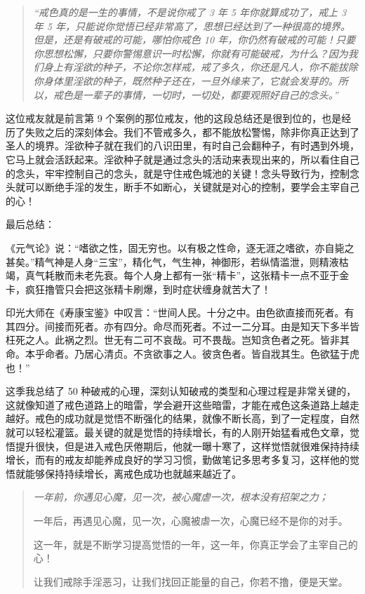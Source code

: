 \begin{quote}\it
    “戒色真的是一生的事情，不是说你戒了 3 年 5 年你就算成功了，戒上 3 年 5 年，只能说你觉悟已经非常高了，思想已经达到了一种很高的境界。但是，还是有破戒的可能，哪怕你戒色 10 年，你仍然有破戒的可能！只要你思想松懈，只要你警惕意识一时松懈，你就有可能破戒，为什么？因为我们身上有淫欲的种子，不论你怎样戒，戒了多久，你还是凡人，你不能拔除你身体里淫欲的种子，既然种子还在，一旦外缘来了，它就会发芽的。所以，戒色是一辈子的事情，一切时，一切处，都要观照好自己的念头。”
\end{quote}

这位戒友就是前言第 9 个案例的那位戒友，他的这段总结还是很到位的，也是经历了失败之后的深刻体会。我们不管戒多久，都不能放松警惕，除非你真正达到了圣人的境界。淫欲种子就在我们的八识田里，有时自己会翻种子，有时遇到外境，它马上就会活跃起来。淫欲种子就是通过念头的活动来表现出来的，所以看住自己的念头，牢牢控制自己的念头，就是守住戒色城池的关键！念头导致行为，控制念头就可以断绝手淫的发生，断手不如断心，关键就是对心的控制，要学会主宰自己的心！

最后总结：

《元气论》说：“嗜欲之性，固无穷也。以有极之性命，逐无涯之嗜欲，亦自毙之甚矣。”精气神是人身“三宝”，精化气，气生神，神御形，若纵情滥泄，则精液枯竭，真气耗散而未老先衰。每个人身上都有一张“精卡”，这张精卡一点不亚于金卡，疯狂撸管只会把这张精卡刷爆，到时症状缠身就苦大了！

印光大师在《寿康宝鉴》中叹言：“世间人民。十分之中。由色欲直接而死者。有其四分。间接而死者。亦有四分。命尽而死者。不过一二分耳。由是知天下多半皆枉死之人。此祸之烈。世无有二可不哀哉。可不畏哉。岂知贪色者之死。皆非其命。本乎命者。乃居心清贞。不贪欲事之人。彼贪色者。皆自戕其生。色欲猛于虎也！”

这季我总结了 50 种破戒的心理，深刻认知破戒的类型和心理过程是非常关键的，这就像知道了戒色道路上的暗雷，学会避开这些暗雷，才能在戒色这条道路上越走越好。戒色的成功就是觉悟不断强化的结果，就像不断长高，到了一定程度，自然就可以轻松灌篮。最关键的就是觉悟的持续增长，有的人刚开始猛看戒色文章，觉悟提升很快，但是进入戒色厌倦期后，他就一曝十寒了，这样觉悟就很难保持持续增长，而有的戒友却能养成良好的学习习惯，勤做笔记多思考多复习，这样他的觉悟就能够保持持续增长，离戒色成功也就越来越近了。

\begin{quotation}\it
    一年前，你遇见心魔，见一次，被心魔虐一次，根本没有招架之力；

    一年后，再遇见心魔，见一次，心魔被虐一次，心魔已经不是你的对手。

    这一年，就是不断学习提高觉悟的一年，这一年，你真正学会了主宰自己的心！

    让我们戒除手淫恶习，让我们找回正能量的自己，你若不撸，便是天堂。
\end{quotation}
